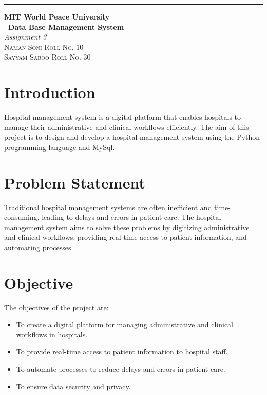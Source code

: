 \documentclass{article}
\begin{document}
\begin{titlepage} %
		
		\raggedleft\rule{1pt}{\textheight} %
		\hspace{0.05\textwidth} %
		\parbox[b]{0.75\textwidth}
		{ %
			
			{\Huge\bfseries MIT World Peace University \\[0.5\baselineskip] \ Data Base Management System}\\[2\baselineskip] %
			{\large\textit{Assignment 3}}\\[4\baselineskip] %
			{\Large\textsc{Naman Soni Roll No. 10\\
			Sayyam Saboo Roll No. 30}} %
			
			\vspace{0.5\textheight} %
		}
		
\end{titlepage}
\tableofcontents
\pagebreak

\section{\textbf{Introduction}}
Hospital management system is a digital platform that enables hospitals to manage their administrative and clinical workflows efficiently. The aim of this project is to design and develop a hospital management system using the Python programming language and MySql.

\section{\textbf{Problem Statement}}
Traditional hospital management systems are often inefficient and time-consuming, leading to delays and errors in patient care. The hospital management system aims to solve these problems by digitizing administrative and clinical workflows, providing real-time access to patient information, and automating processes.

\section{\textbf{Objective}}
The objectives of the project are:
\begin{itemize}
    \item To create a digital platform for managing administrative and clinical workflows in hospitals.
    \item To provide real-time access to patient information to hospital staff.
    \item To automate processes to reduce delays and errors in patient care.
    \item To ensure data security and privacy.
    
\end{itemize}
\end{document}
